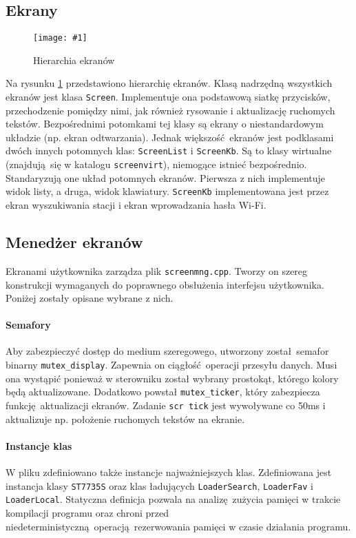 \documentclass[12pt]{report}
\newcommand{\imgint}[4]{
	\begin{figure}[{#4}]
		\centering
		\texttt{[image: \#1]}
		\caption{#2}
		\label{#1}
	\end{figure}
}
\newcommand{\imgh}[3]{\imgint{#1}{#2}{#3}{H}}
\begin{document}
		\subsection{Ekrany}
			\imgh{3/PicoRadio-screens}{Hierarchia ekranów}{0.55} %
			Na rysunku \ref{3/PicoRadio-screens} przedstawiono hierarchię ekranów. Klasą nadrzędną wszystkich ekranów jest klasa \lstinline|Screen|. Implementuje ona podstawową siatkę przycisków, przechodzenie pomiędzy nimi, jak również rysowanie i aktualizację ruchomych tekstów. Bezpośrednimi potomkami tej klasy są ekrany o niestandardowym układzie (np. ekran odtwarzania). Jednak większość ekranów jest podklasami dwóch innych potomnych klas: \lstinline|ScreenList| i \lstinline|ScreenKb|. Są to klasy wirtualne (znajdują się w katalogu \lstinline|screenvirt|), niemogące istnieć bezpośrednio. Standaryzują one układ potomnych ekranów. Pierwsza z nich implementuje widok listy, a druga, widok klawiatury. \lstinline|ScreenKb| implementowana jest przez ekran wyszukiwania stacji i ekran wprowadzania hasła Wi-Fi.
			
		\subsection{Menedżer ekranów}
			Ekranami użytkownika zarządza plik \lstinline|screenmng.cpp|. Tworzy on szereg konstrukcji wymaganych do poprawnego obsłużenia interfejsu użytkownika. Poniżej zostały opisane wybrane z nich.
			
			\paragraph{Semafory}
				Aby zabezpieczyć dostęp do medium szeregowego, utworzony został semafor binarny \lstinline|mutex_display|. Zapewnia on ciągłość operacji przesyłu danych. Musi ona wystąpić ponieważ w sterowniku został wybrany prostokąt, którego kolory będą aktualizowane. Dodatkowo powstał \lstinline|mutex_ticker|, który zabezpiecza funkcję aktualizacji ekranów. Zadanie \lstinline|scr tick| jest wywoływane co 50ms i aktualizuje np. położenie ruchomych tekstów na ekranie.
				
			\paragraph{Instancje klas}
				W pliku zdefiniowano także instancje najważniejszych klas. Zdefiniowana jest instancja klasy \lstinline|ST7735S| oraz klas ładujących \lstinline|LoaderSearch|, \lstinline|LoaderFav| i \lstinline|LoaderLocal|. Statyczna definicja pozwala na analizę zużycia pamięci w trakcie kompilacji programu oraz chroni przed niedeterministyczną operacją rezerwowania pamięci w czasie działania programu.
				
\end{document}
